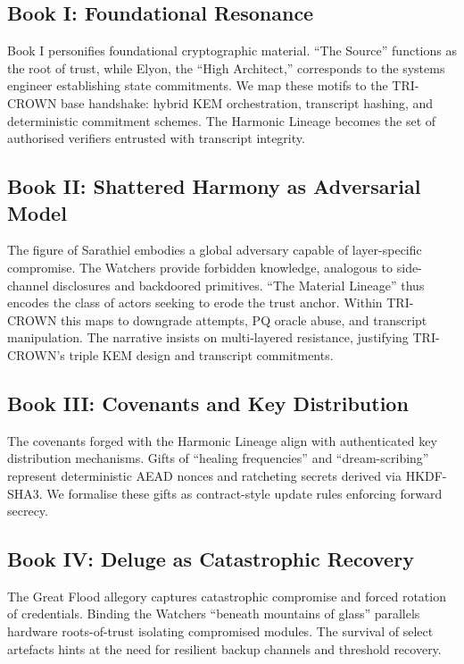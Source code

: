 \documentclass[submission]{iacrtrans}
\begin{document}
\subsection{Book I: Foundational Resonance}
Book I personifies foundational cryptographic material. ``The Source'' functions as the root of trust, while Elyon, the ``High Architect,'' corresponds to the systems engineer establishing state commitments. We map these motifs to the TRI-CROWN base handshake: hybrid KEM orchestration, transcript hashing, and deterministic commitment schemes. The Harmonic Lineage becomes the set of authorised verifiers entrusted with transcript integrity.

\subsection{Book II: Shattered Harmony as Adversarial Model}
The figure of Sarathiel embodies a global adversary capable of layer-specific compromise. The Watchers provide forbidden knowledge, analogous to side-channel disclosures and backdoored primitives. ``The Material Lineage'' thus encodes the class of actors seeking to erode the trust anchor. Within TRI-CROWN this maps to downgrade attempts, PQ oracle abuse, and transcript manipulation. The narrative insists on multi-layered resistance, justifying TRI-CROWN's triple KEM design and transcript commitments.

\subsection{Book III: Covenants and Key Distribution}
The covenants forged with the Harmonic Lineage align with authenticated key distribution mechanisms. Gifts of ``healing frequencies'' and ``dream-scribing'' represent deterministic AEAD nonces and ratcheting secrets derived via HKDF-SHA3. We formalise these gifts as contract-style update rules enforcing forward secrecy.

\subsection{Book IV: Deluge as Catastrophic Recovery}
The Great Flood allegory captures catastrophic compromise and forced rotation of credentials. Binding the Watchers ``beneath mountains of glass'' parallels hardware roots-of-trust isolating compromised modules. The survival of select artefacts hints at the need for resilient backup channels and threshold recovery.
\end{document}
